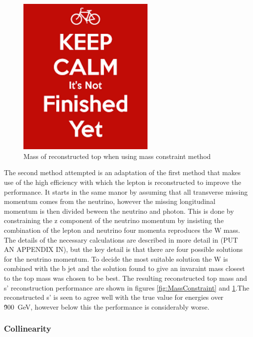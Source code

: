 \begin{figure}
  \centering
  \includegraphics[width=0.6\textwidth]{TopAnalysis/figures/dummy}
  \caption[Mass of reconstructed top when using mass constraint method]{Mass of reconstructed top when using mass constraint method}
  \label{fig:TopMassFrommassMethod}
\end{figure}

The second method attempted is an adaptation of the first method that makes use of the high efficiency with which the lepton is reconstructed to improve the performance. It starts in the same manor by assuming that all transverse missing momentum comes from the neutrino, however the missing longitudinal momentum is then divided beween the neutrino and photon. This is done by constraining the z component of the neutrino momentum by insisting the combination of the lepton and neutrino four momenta reproduces the W mass. The details of the necessary calculations are described in more detail in (PUT AN APPENDIX IN), but the key detail is that there are four possible solutions for the neutrino momentum. To decide the most suitable solution the W is combined with the b jet and the solution found to give an invaraint mass closest to the top mass was chosen to be best. The resulting reconstructed top mass and s' reconstruction performance are shown in figures \ref{fig:MassConstraint} and \ref{fig:TopMassFrommassMethod}.The reconstructed s' is seen to agree well with the true value for energies over \~900~GeV, however below this the performance is considerably worse.

\subsubsection{Collinearity}

